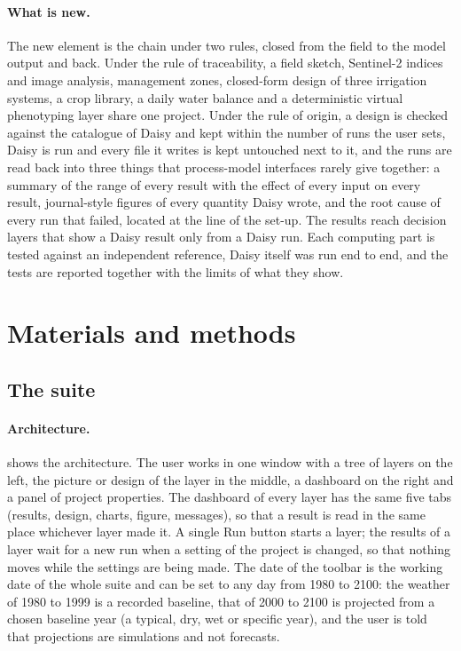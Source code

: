 \paragraph{What is new.} The new element is the chain under two rules, closed from the field to the model output and back. Under the rule of traceability, a field sketch, Sentinel-2 indices and image analysis, management zones, closed-form design of three irrigation systems, a crop library, a daily water balance and a deterministic virtual phenotyping layer share one project. Under the rule of origin, a design is checked against the catalogue of Daisy and kept within the number of runs the user sets, Daisy is run and every file it writes is kept untouched next to it, and the runs are read back into three things that process-model interfaces rarely give together: a summary of the range of every result with the effect of every input on every result, journal-style figures of every quantity Daisy wrote, and the root cause of every run that failed, located at the line of the set-up. The results reach decision layers that show a Daisy result only from a Daisy run. Each computing part is tested against an independent reference, Daisy itself was run end to end, and the tests are reported together with the limits of what they show.

\section{Materials and methods}

\subsection{The suite}

\paragraph{Architecture.}
 shows the architecture. The user works in one window with a tree of layers on the left, the picture or design of the layer in the middle, a dashboard on the right and a panel of project properties. The dashboard of every layer has the same five tabs (results, design, charts, figure, messages), so that a result is read in the same place whichever layer made it. A single Run button starts a layer; the results of a layer wait for a new run when a setting of the project is changed, so that nothing moves while the settings are being made. The date of the toolbar is the working date of the whole suite and can be set to any day from 1980 to 2100: the weather of 1980 to 1999 is a recorded baseline, that of 2000 to 2100 is projected from a chosen baseline year (a typical, dry, wet or specific year), and the user is told that projections are simulations and not forecasts.

